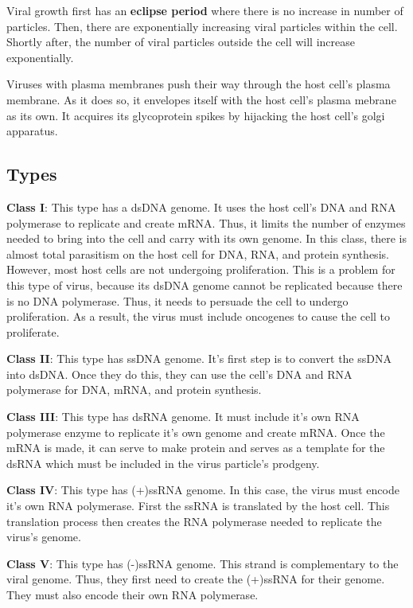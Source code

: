 \documentclass{article}
\begin{document}
Viral growth first has an \textbf{eclipse period} where there is no increase in
number of particles. Then, there are exponentially increasing viral particles
within the cell. Shortly after, the number of viral particles outside the cell
will increase exponentially.

Viruses with plasma membranes push their way through the host cell's plasma
membrane. As it does so, it envelopes itself with the host cell's plasma mebrane
as its own. It acquires its glycoprotein spikes by hijacking the host cell's
golgi apparatus.

\subsection{Types}

\textbf{Class I}: This type has a dsDNA genome. It uses the host cell's DNA and
RNA polymerase to replicate and create mRNA. Thus, it limits the number of
enzymes needed to bring into the cell and carry with its own genome. In this
class, there is almost total parasitism on the host cell for DNA, RNA, and
protein synthesis. However, most host cells are not undergoing proliferation.
This is a problem for this type of virus, because its dsDNA genome cannot be
replicated because there is no DNA polymerase. Thus, it needs to persuade the
cell to undergo proliferation. As a result, the virus must include oncogenes to
cause the cell to proliferate.

\textbf{Class II}: This type has ssDNA genome. It's first step is to convert the
ssDNA into dsDNA. Once they do this, they can use the cell's DNA and RNA
polymerase for DNA, mRNA, and protein synthesis.

\textbf{Class III}: This type has dsRNA genome. It must include it's own RNA
polymerase enzyme to replicate it's own genome and create mRNA. Once the mRNA is
made, it can serve to make protein and serves as a template for the dsRNA which
must be included in the virus particle's prodgeny. 

\textbf{Class IV}: This type has (+)ssRNA genome. In this case, the virus must
encode it's own RNA polymerase. First the ssRNA is translated by the host cell.
This translation process then creates the RNA polymerase needed to replicate the
virus's genome. 

\textbf{Class V}: This type has (-)ssRNA genome. This strand is complementary
to the viral genome. Thus, they first need to create the (+)ssRNA for their
genome. They must also encode their own RNA polymerase. 
\end{document}
